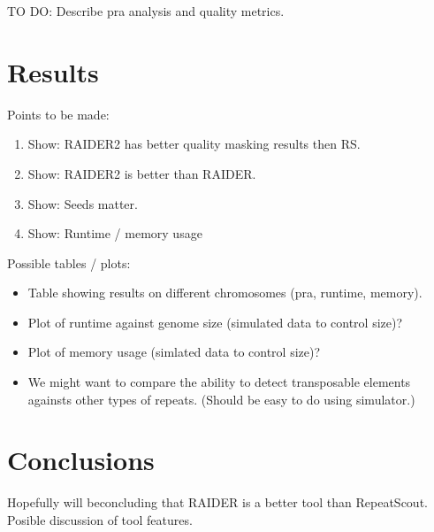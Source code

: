 \documentclass{bmcart}
\newcommand{\red}[1]{{\color{red}#1}}
\begin{document}
\red{
TO DO: Describe pra analysis and quality metrics.
}


\section*{Results}

\red{
Points to be made:
\begin{enumerate}
\item Show: RAIDER2 has better quality masking results then RS.
\item Show: RAIDER2 is better than RAIDER.
\item Show: Seeds matter.
\item Show: Runtime / memory usage
\end{enumerate}


Possible tables / plots:
\begin{itemize}
\item Table showing results on different chromosomes (pra, runtime, memory).
\item Plot of runtime against genome size (simulated data to control size)?
\item Plot of memory usage (simlated data to control size)?
\item We might want to compare the ability to detect transposable
  elements againsts other types of repeats.  (Should be easy to do
  using simulator.)
\end{itemize}
}

\section*{Conclusions}

\red {
Hopefully will beconcluding that RAIDER is a better tool than
RepeatScout.  Posible discussion of tool features.
}


  
    









\end{document}
